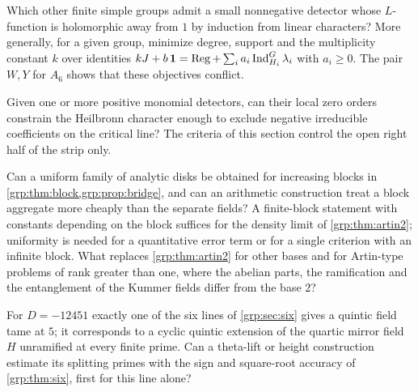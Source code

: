 \begin{question}\label{grp:q:groups}
Which other finite simple groups admit a small nonnegative detector whose
$L$-function is holomorphic away from $1$ by induction from linear characters?
More generally, for a given group, minimize degree, support and the
multiplicity constant $k$ over identities
$kJ+b\,\mathbf{1}=\operatorname{Reg}+\sum_ia_i\operatorname{Ind}_{H_i}^G\lambda_i$ with $a_i\ge0$. The pair
$W,Y$ for $A_6$ shows that these objectives conflict.
\end{question}

\begin{question}\label{grp:q:line}
Given one or more positive monomial detectors, can their local zero orders
constrain the Heilbronn character enough to exclude negative irreducible
coefficients on the critical line? The criteria of this section control the
open right half of the strip only.
\end{question}

\begin{question}\label{grp:q:kummer}
Can a uniform family of analytic disks be obtained for increasing blocks in
\cref{grp:thm:block,grp:prop:bridge}, and can an arithmetic construction treat
a block aggregate more cheaply than the separate fields? A finite-block
statement with constants depending on the block suffices for the density
limit of \cref{grp:thm:artin2}; uniformity is needed for a quantitative error
term or for a single criterion with an infinite block. What replaces
\cref{grp:thm:artin2} for other bases and for Artin-type problems of rank
greater than one, where the abelian parts, the ramification and the
entanglement of the Kummer fields differ from the base $2$?
\end{question}

\begin{question}\label{grp:q:tame}
For $D=-12451$ exactly one of the six lines of \cref{grp:sec:six} gives a
quintic field tame at $5$; it corresponds to a cyclic quintic extension of the
quartic mirror field $H$ unramified at every finite prime. Can a theta-lift or
height construction estimate its splitting primes with the sign and
square-root accuracy of \cref{grp:thm:six}, first for this line alone?
\end{question}

\endgroup
